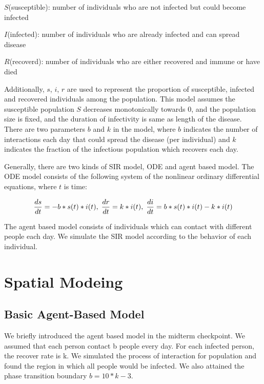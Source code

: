 \documentclass{article}
\begin{document}
$S$(susceptible): number of individuals who are not infected but could become infected

$I$(infected): number of individuals who are already infected and can spread disease

$R$(recoverd): number of individuals who are either recovered and immune or have died

Additionally, $s$, $i$, $r$ are used to represent the proportion of susceptible, infected and recovered individuals among the population. This model assumes the susceptible population $S$ decreases monotonically towards 0, and the population size is fixed, and the duration of infectivity is same as length of the disease. There are two parameters $b$ and $k$ in the model, where $b$ indicates the number of interactions each day that could spread the disease (per individual) and $k$ indicates the fraction of the infectious population which recovers each day.

Generally, there are two kinds of SIR model, ODE and agent based model. The ODE model consists of the following system of the nonlinear ordinary differential equations, where $t$ is time:

$$\frac{ds}{dt} = -b * s(t) * i(t), \hspace{0.1cm}
\frac{dr}{dt} = k * i(t), \hspace{0.1cm}
\frac{di}{dt} = b * s(t) * i(t) - k * i(t)$$


The agent based model consists of individuals which can contact with different people each day. We simulate the SIR model according to the behavior of each individual.  





\section{Spatial Modeing}

\subsection{Basic Agent-Based Model}

We briefly introduced the agent based model in the midterm checkpoint. We assumed that each person contact b people every day. For each infected person, the recover rate is k. We simulated the process of interaction for population and found the region in which all people would be infected. We also attained the phase transition boundary $b = 10*k - 3$.
\end{document}
